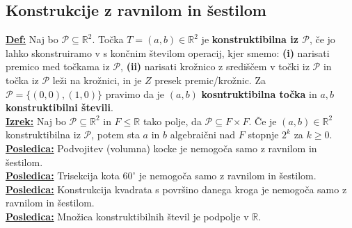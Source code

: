 \documentclass[a4paper,oneside,8pt,landscape]{extarticle}
\let\oldtextbf\textbf
\renewcommand{\textbf}[1]{\oldtextbf{\boldmath #1}}
\newcommand{\definicija}[1]{\textbf{\underline{Def:} }{#1}\\}
\newcommand{\posledica}[1]{\textbf{\underline{Posledica:} }{#1}\\}
\newcommand{\izrek}[1]{\textbf{\underline{Izrek:} }{#1}\\}
\newcommand{\bt}[1]{\textbf{#1}}
\begin{document}
\begin{multicols*}{3}
\subsection*{Konstrukcije z ravnilom in šestilom}
\definicija{Naj bo $\mathcal{P}\subseteq \mathbb{R}^2$. Točka $ T =(a,b)\in \mathbb{R}^2$ je \bt{konstruktibilna iz $\mathcal{P}$}, če jo lahko skonstruiramo v s končnim številom operacij, kjer smemo: \bt{(i)} narisati premico med točkama iz $\mathcal{P}$, \bt{(ii)} narisati krožnico z središčem v točki iz $\mathcal{P}$ in točka iz $\mathcal{P}$ leži na krožnici, in je $Z$ presek premic/krožnic. Za $\mathcal{P}=\{(0,0),(1,0)\}$ pravimo da je $(a,b)$ \bt{kosntruktibilna točka} in $a,b$ \bt{konstruktibilni števili}.}
\izrek{Naj bo $\mathcal{P}\subseteq \mathbb{R}^2$ in $F\leq \mathbb{R}$ tako polje, da $\mathcal{P}\subseteq F\times F$. Če je $(a,b)\in \mathbb{R}^2$ konstruktibilna iz $\mathcal{P}$, potem sta $a$ in $b$ algebraični nad $F$ stopnje $2^k$ za $k\geq 0$. }
\posledica{Podvojitev (volumna) kocke je nemogoča samo z ravnilom in šestilom.}
\posledica{Trisekcija kota $60^{\circ}$ je nemogoča samo z ravnilom in šestilom.}
\posledica{Konstrukcija kvadrata s površino danega kroga je nemogoča samo z ravnilom in šestilom.}
\posledica{Množica konstruktibilnih števil je podpolje v $\mathbb{R}$.}
\vspace{-15pt}

\end{multicols*}
\end{document}
